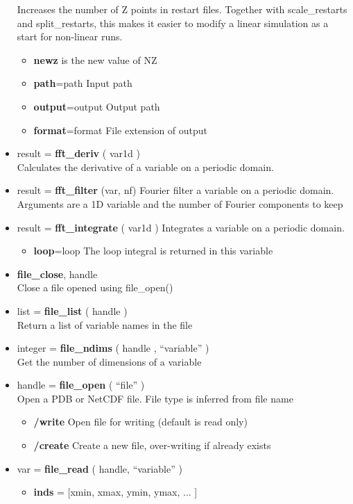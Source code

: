 \documentclass[12pt]{article}
\begin{document}
\begin{itemize}
  Increases the number of Z points in restart files. Together with
  scale\_restarts and split\_restarts, this makes it easier to modify a
  linear simulation as a start for non-linear runs.
  \begin{itemize}
  \item {\bf newz} is the new value of NZ
  \item {\bf path}=path      Input path
  \item {\bf output}=output  Output path
  \item {\bf format}=format  File extension of output
  \end{itemize}
\item result = {\bf fft\_deriv} ( var1d ) \\
  Calculates the derivative of a variable on a periodic domain.
\item result = {\bf fft\_filter} (var, nf)
  Fourier filter a variable on a periodic domain. Arguments are a
  1D variable and the number of Fourier components to keep
\item result = {\bf fft\_integrate} ( var1d )
  Integrates a variable on a periodic domain.
  \begin{itemize}
  \item {\bf loop}=loop  The loop integral is returned in this variable
  \end{itemize}
\item {\bf file\_close}, handle \\
  Close a file opened using file\_open()
\item list = {\bf file\_list} ( handle ) \\
  Return a list of variable names in the file
\item integer = {\bf file\_ndims} ( handle , ``variable'' ) \\
  Get the number of dimensions of a variable
\item handle = {\bf file\_open} ( ``file'' ) \\
  Open a PDB or NetCDF file. File type is inferred from file name
  \begin{itemize}
    \item {\bf /write}  Open file for writing (default is read only)
    \item {\bf /create} Create a new file, over-writing if already exists
  \end{itemize}
\item var = {\bf file\_read} ( handle, ``variable'' )
  \begin{itemize}
    \item {\bf inds} = [xmin, xmax, ymin, ymax, ... ]

\end{itemize}
\end{itemize}
\end{document}
